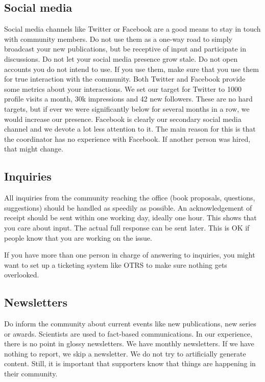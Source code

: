 \documentclass[nonflat,smallfont
]{langsci/langscibook}
\begin{document}
\subsection{Social media}
Social media channels like Twitter or Facebook are a good means to stay in touch with community members. Do not use them as a one-way road to simply broadcast your new publications, but be receptive of input and participate in discussions. Do not let your social media presence grow stale. Do not open accounts you do not intend to use. If you use them, make sure that you use them for true interaction with the community. Both Twitter and Facebook provide some metrics about your interactions. We set our target for Twitter to 1000 profile visits a month, 30k impressions and 42 new followers. These are no hard targets, but if ever we were significantly below for several months in a row, we would increase our presence. 
Facebook is clearly our secondary social media channel and we devote a lot less attention to it. The main reason for this is that the coordinator has no experience with Facebook. If another person was hired, that might change. 

\subsection{Inquiries}
All inquiries from the community reaching the office (book proposals, questions, suggestions) should be handled as speedily as possible. An acknowledgement of receipt should be sent within one working day, ideally one hour. This shows that you care about input. The actual full response can be sent later. This is OK if people know that you are working on the issue.


If you have more than one person in charge of answering to inquiries, you might want to set up a ticketing system like OTRS to make sure nothing gets overlooked. 

\subsection{Newsletters}
Do inform the community about current events like new publications, new series or awards. Scientists are used to fact-based communications. In our experience, there is no point in glossy newsletters. We have monthly newsletters. If we have nothing to report, we skip a newsletter. We do not try to artificially generate content. Still, it is important that supporters know that things are happening in their community.
\end{document}
